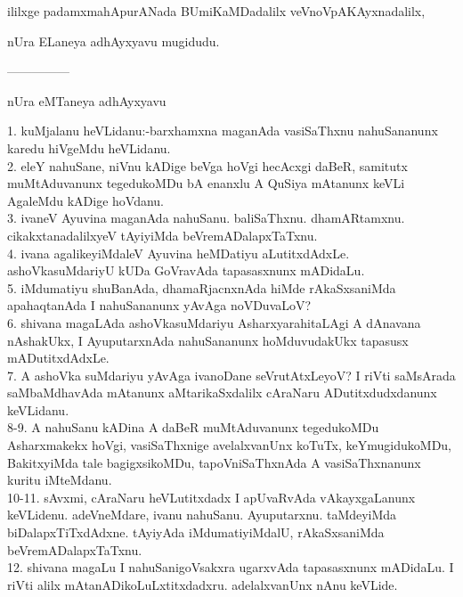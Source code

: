 \documentclass{article}
\begin{document}
\begin{center}
ililxge padamxmahApurANada BUmiKaMDadalilx veVnoVpAKAyxnadalilx,
\end{center}

\begin{center}
nUra ELaneya adhAyxyavu mugidudu.
\end{center}

\begin{center}
---------------
\end{center}

\begin{center}
nUra eMTaneya adhAyxyavu
\end{center}

1. kuMjalanu heVLidanu:-barxhamxna maganAda vasiSaThxnu nahuSananunx karedu hiVgeMdu heVLidanu.\\
2. eleY nahuSane, niVnu kADige beVga hoVgi hecAcxgi daBeR, samitutx muMtAduvanunx tegedukoMDu bA enanxlu A QuSiya mAtanunx keVLi AgaleMdu kADige hoVdanu.\\
3. ivaneV Ayuvina maganAda nahuSanu. baliSaThxnu. dhamARtamxnu. cikakxtanadalilxyeV tAyiyiMda beVremADalapxTaTxnu.\\
4. ivana agalikeyiMdaleV Ayuvina heMDatiyu aLutitxdAdxLe. ashoVkasuMdariyU kUDa GoVravAda tapasasxnunx mADidaLu.\\
5. iMdumatiyu shuBanAda, dhamaRjacnxnAda hiMde rAkaSxsaniMda apahaqtanAda I nahuSananunx yAvAga noVDuvaLoV?\\
6. shivana magaLAda ashoVkasuMdariyu  AsharxyarahitaLAgi A dAnavana nAshakUkx, I AyuputarxnAda nahuSananunx hoMduvudakUkx tapasusx mADutitxdAdxLe.\\
7. A ashoVka suMdariyu yAvAga ivanoDane seVrutAtxLeyoV? I riVti saMsArada saMbaMdhavAda mAtanunx aMtarikaSxdalilx cAraNaru ADutitxdudxdanunx keVLidanu.\\
8-9. A nahuSanu kADina A daBeR muMtAduvanunx tegedukoMDu Asharxmakekx hoVgi, vasiSaThxnige avelalxvanUnx koTuTx, keYmugidukoMDu, BakitxyiMda tale bagigxsikoMDu, tapoVniSaThxnAda A vasiSaThxnanunx kuritu iMteMdanu.\\
10-11. sAvxmi, cAraNaru heVLutitxdadx I apUvaRvAda vAkayxgaLanunx keVLidenu. adeVneMdare, ivanu nahuSanu. Ayuputarxnu. taMdeyiMda biDalapxTiTxdAdxne. tAyiyAda iMdumatiyiMdalU, rAkaSxsaniMda beVremADalapxTaTxnu.\\
12. shivana magaLu I nahuSanigoVsakxra ugarxvAda tapasasxnunx mADidaLu. I riVti alilx mAtanADikoLuLxtitxdadxru. adelalxvanUnx nAnu keVLide.\\
\end{document}
